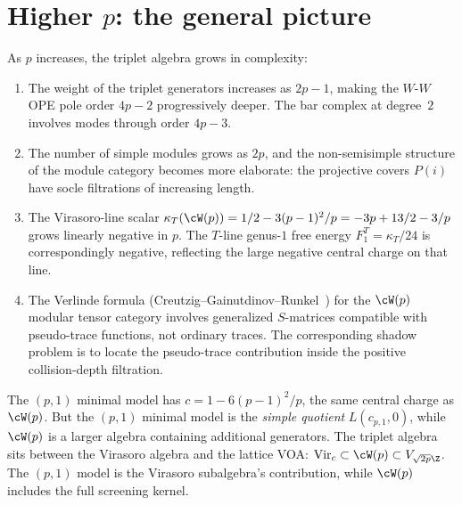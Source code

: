 
\section{Higher \texorpdfstring{$p$}{p}: the general
picture}\label{sec:wp-higher-p}

As $p$ increases, the triplet algebra grows in complexity:

\begin{enumerate}
\item The weight of the triplet generators increases as
$2p - 1$, making the $W$-$W$ OPE pole order $4p - 2$
progressively deeper. The bar complex at degree~$2$
involves modes through order $4p - 3$.

\item The number of simple modules grows as $2p$, and the
non-semisimple structure of the module category becomes
more elaborate: the projective covers $P(i)$ have
socle filtrations of increasing length.

\item The Virasoro-line scalar
$\kappa_T(\cW(p)) = 1/2 - 3(p-1)^2/p
= -3p + 13/2 - 3/p$
grows linearly negative in $p$. The $T$-line genus-$1$ free
energy $F_1^T = \kappa_T/24$ is correspondingly negative,
reflecting the large negative central charge on that line.

\item The Verlinde formula
(Creutzig--Gainutdinov--Runkel~\cite{CreutzigGainutdinovRunkel20}) for
the $\cW(p)$ modular tensor category involves
generalized $S$-matrices compatible with
pseudo-trace functions, not ordinary traces.
The corresponding shadow problem is to locate the pseudo-trace
contribution inside the positive collision-depth filtration.
\end{enumerate}

\begin{remark}
\label{rem:wp-minimal-models}
The $(p,1)$ minimal model has $c = 1 - 6(p-1)^2/p$,
the same central charge as $\cW(p)$. But the $(p,1)$
minimal model is the \emph{simple quotient}
$L(c_{p,1}, 0)$, while $\cW(p)$ is a larger algebra
containing additional generators. The triplet algebra
sits between the Virasoro algebra and the lattice VOA:
$\mathrm{Vir}_c \subset \cW(p) \subset V_{\sqrt{2p}\Z}$.
The $(p,1)$ model is the Virasoro subalgebra's contribution,
while $\cW(p)$ includes the full screening kernel.
\end{remark}


